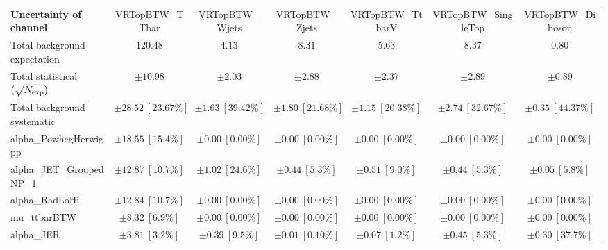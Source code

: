 
\begin{sidewaystable}
\begin{center}
\setlength{\tabcolsep}{0.0pc}
\begin{tabular*}{\textwidth}{@{\extracolsep{\fill}}lcccccc}
\noalign{\smallskip}\hline\noalign{\smallskip}
{\bf Uncertainty of channel}                                    & VRTopBTW\_TTbar            & VRTopBTW\_Wjets            & VRTopBTW\_Zjets            & VRTopBTW\_TtbarV            & VRTopBTW\_SingleTop            & VRTopBTW\_Diboson            \\
\noalign{\smallskip}\hline\noalign{\smallskip}
Total background expectation             &  $120.48$        &  $4.13$        &  $8.31$        &  $5.63$        &  $8.37$        &  $0.80$       \\
\noalign{\smallskip}\hline\noalign{\smallskip}
Total statistical $(\sqrt{N_{\rm exp}})$              & $\pm 10.98$        & $\pm 2.03$        & $\pm 2.88$        & $\pm 2.37$        & $\pm 2.89$        & $\pm 0.89$       \\
Total background systematic               & $\pm 28.52\ [23.67\%] $        & $\pm 1.63\ [39.42\%] $        & $\pm 1.80\ [21.68\%] $        & $\pm 1.15\ [20.38\%] $        & $\pm 2.74\ [32.67\%] $        & $\pm 0.35\ [44.37\%] $             \\
\noalign{\smallskip}\hline\noalign{\smallskip}
\noalign{\smallskip}\hline\noalign{\smallskip}
alpha\_PowhegHerwigpp         & $\pm 18.55\ [15.4\%] $          & $\pm 0.00\ [0.00\%] $          & $\pm 0.00\ [0.00\%] $          & $\pm 0.00\ [0.00\%] $          & $\pm 0.00\ [0.00\%] $          & $\pm 0.00\ [0.00\%] $       \\
alpha\_JET\_GroupedNP\_1         & $\pm 12.87\ [10.7\%] $          & $\pm 1.02\ [24.6\%] $          & $\pm 0.44\ [5.3\%] $          & $\pm 0.51\ [9.0\%] $          & $\pm 0.44\ [5.3\%] $          & $\pm 0.05\ [5.8\%] $       \\
alpha\_RadLoHi         & $\pm 12.84\ [10.7\%] $          & $\pm 0.00\ [0.00\%] $          & $\pm 0.00\ [0.00\%] $          & $\pm 0.00\ [0.00\%] $          & $\pm 0.00\ [0.00\%] $          & $\pm 0.00\ [0.00\%] $       \\
mu\_ttbarBTW         & $\pm 8.32\ [6.9\%] $          & $\pm 0.00\ [0.00\%] $          & $\pm 0.00\ [0.00\%] $          & $\pm 0.00\ [0.00\%] $          & $\pm 0.00\ [0.00\%] $          & $\pm 0.00\ [0.00\%] $       \\
alpha\_JER         & $\pm 3.81\ [3.2\%] $          & $\pm 0.39\ [9.5\%] $          & $\pm 0.01\ [0.10\%] $          & $\pm 0.07\ [1.2\%] $          & $\pm 0.45\ [5.3\%] $          & $\pm 0.30\ [37.7\%] $       \\

\end{tabular*}
\end{center}
\end{sidewaystable}
